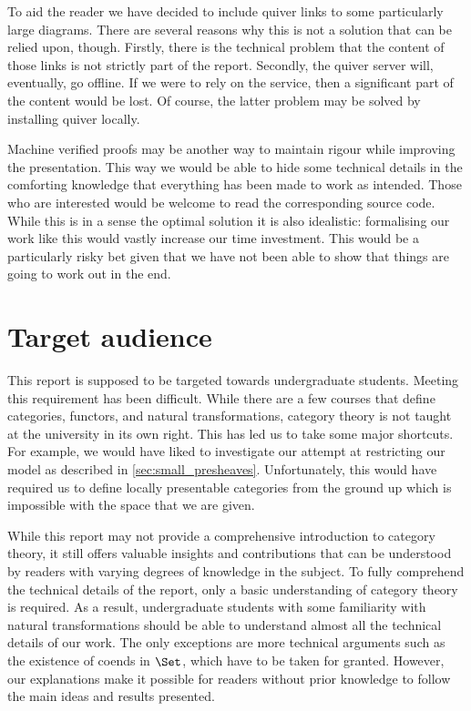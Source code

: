 To aid the reader we have decided to include quiver links to some particularly
large diagrams. There are several reasons why this is not a solution that can be
relied upon, though. Firstly, there is the technical problem that the content of
those links is not strictly part of the report. Secondly, the quiver server
will, eventually, go offline. If we were to rely on the service, then a
significant part of the content would be lost. Of course, the latter problem
may be solved by installing quiver locally.

Machine verified proofs may be another way to maintain rigour while improving
the presentation. This way we would be able to hide some technical details in the
comforting knowledge that everything has been made to work as intended.
Those who are interested would be welcome to read the corresponding source
code. While this is in a sense the optimal solution it is also idealistic:
formalising our work like this would vastly increase our time investment.
This would be a particularly risky bet given that we have not been able
to show that things are going to work out in the end.

\section{Target audience}

This report is supposed to be targeted towards undergraduate students. Meeting
this requirement has been difficult. While there are a few courses that define
categories, functors, and natural transformations, category theory is not taught
at the university in its own right. This has led us to take some major
shortcuts. For example, we would have liked to investigate our attempt at
restricting our model as described in \ref{sec:small_presheaves}. Unfortunately,
this would have required us to define locally presentable categories from the
ground up which is impossible with the space that we are given.

While this report may not provide a comprehensive introduction to category
theory, it still offers valuable insights and contributions that can be
understood by readers with varying degrees of knowledge in the subject. To
fully comprehend the technical details of the report, only a basic understanding of
category theory is required. As a result, undergraduate students with some
familiarity with natural transformations should be able to understand almost
all the technical details of our work. The only exceptions are more technical
arguments such as the existence of coends in $\Set$, which have to be taken for
granted. However, our explanations make it possible for readers without prior
knowledge to follow the main ideas and results presented.

